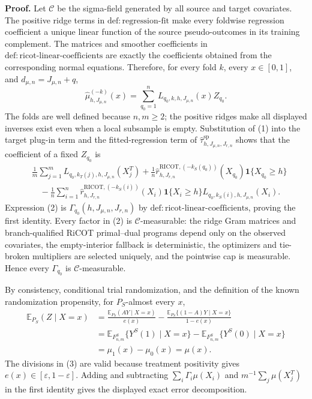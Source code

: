 \textbf{Proof.}
Let \(\mathcal C\) be the sigma-field generated by all source and target covariates. The positive ridge terms in \(\mathrm{def:regression\text{-}fit}\) make every foldwise regression coefficient a unique linear function of the source pseudo-outcomes in its training complement. The matrices and smoother coefficients in \(\mathrm{def:ricot\text{-}linear\text{-}coefficients}\) are exactly the coefficients obtained from the corresponding normal equations. Therefore, for every fold \(k\), every \(x\in[0,1]\), and \(d_{\mu,n}=J_{\mu,n}+q\),
\[
\widehat\mu^{(-k)}_{h,J_{\mu,n}}(x)
=\sum_{q_0=1}^n L_{q_0,k,h,J_{\mu,n}}(x)Z_{q_0}.
\tag{1}
\]
The folds are well defined because \(n,m\ge2\); the positive ridges make all displayed inverses exist even when a local subsample is empty. Substitution of (1) into the target plug-in term and the fitted-regression term of \(\widehat\tau^{\mathrm{sp}}_{h,J_{\mu,n},J_{r,n}}\) shows that the coefficient of a fixed \(Z_{q_0}\) is
\[
\begin{aligned}
{}&\frac1m\sum_{j=1}^mL_{q_0,k_T(j),h,J_{\mu,n}}(X_j^T)
+\frac1n\widehat r^{\mathrm{RICOT},(-k_S(q_0))}_{h,J_{r,n}}(X_{q_0})\mathbf 1\{X_{q_0}\ge h\}\\
&\quad-\frac1n\sum_{i=1}^n
\widehat r^{\mathrm{RICOT},(-k_S(i))}_{h,J_{r,n}}(X_i)\mathbf 1\{X_i\ge h\}
L_{q_0,k_S(i),h,J_{\mu,n}}(X_i).
\end{aligned}
\tag{2}
\]
Expression (2) is \(\Gamma_{q_0}(h,J_{\mu,n},J_{r,n})\) by \(\mathrm{def:ricot\text{-}linear\text{-}coefficients}\), proving the first identity. Every factor in (2) is \(\mathcal C\)-measurable: the ridge Gram matrices and branch-qualified RiCOT primal--dual programs depend only on the observed covariates, the empty-interior fallback is deterministic, the optimizers and tie-broken multipliers are selected uniquely, and the pointwise cap is measurable. Hence every \(\Gamma_{q_0}\) is \(\mathcal C\)-measurable.

By consistency, conditional trial randomization, and the definition of the known randomization propensity, for \(P_S\)-almost every \(x\),
\[
\begin{aligned}
\mathbb E_{P_S}(Z\mid X=x)
&=\frac{\mathbb E_{P_S}(AY\mid X=x)}{e(x)}
-\frac{\mathbb E_{P_S}\{(1-A)Y\mid X=x\}}{1-e(x)}\\
&=\mathbb E_{F^S_{n,m}}\{Y^S(1)\mid X=x\}
-\mathbb E_{F^S_{n,m}}\{Y^S(0)\mid X=x\}\\
&=\mu_1(x)-\mu_0(x)=\mu(x).
\end{aligned}
\tag{3}
\]
The divisions in (3) are valid because treatment positivity gives \(e(x)\in[\varepsilon,1-\varepsilon]\). Adding and subtracting \(\sum_i\Gamma_i\mu(X_i)\) and \(m^{-1}\sum_j\mu(X_j^T)\) in the first identity gives the displayed exact error decomposition.

